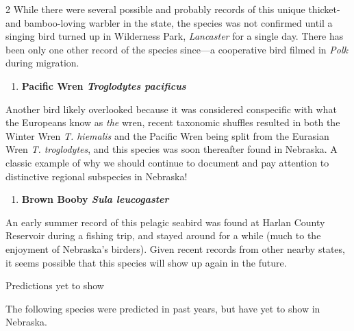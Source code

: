 \documentclass[10pt,letterpaper]{article}
\newcommand{\NewsItem}[1]{%
		\fontspec{QTBrushStroke}
		\large #1 \vspace{4pt}
		\par \normalsize \normalfont}
\begin{document}
\begin{multicols}{2}
		While there were several possible and probably records of this unique thicket- and bamboo-loving warbler in the state, the species was not confirmed until a singing bird turned up in Wilderness Park, \textit{Lancaster} for a single day. There has been only one other record of the species since---a cooperative bird filmed in \textit{Polk} during migration.
		
		\begin{enumerate}[resume]
		\item \textbf{Pacific Wren \textit{Troglodytes pacificus}}
		\end{enumerate}
		Another bird likely overlooked because it was considered conspecific with what the Europeans know as \textit{the} wren, recent taxonomic shuffles resulted in both the Winter Wren \textit{T. hiemalis} and the Pacific Wren being split from the Eurasian Wren \textit{T. troglodytes}, and this species was soon thereafter found in Nebraska. A classic example of why we should continue to document and pay attention to distinctive regional subspecies in Nebraska!
		
		\begin{enumerate}[resume]
		\item \textbf{Brown Booby \textit{Sula leucogaster}}
	\end{enumerate}
	An early summer record of this pelagic seabird was found at Harlan County Reservoir during a fishing trip, and stayed around for a while (much to the enjoyment of Nebraska's birders). Given recent records from other nearby states, it seems possible that this species will show up again in the future.
	
	\end{multicols}
	
	\noindent \NewsItem{Predictions yet to show}
	\noindent The following species were predicted in past years, but have yet to show in Nebraska. 
	
\end{document}
